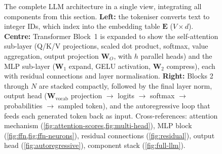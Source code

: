 \begin{landscape}
\begin{figure}[p]
\caption[The complete LLM architecture in a single view.]{%
  The complete LLM architecture in a single view, integrating all
  components from this section. \textbf{Left:} the tokeniser converts
  text to integer IDs, which index into the embedding table $\bm{E}$
  ($V \times d$). \textbf{Centre:} Transformer Block~1 is expanded to
  show the self-attention sub-layer (Q/K/V projections, scaled dot
  product, softmax, value aggregation, output projection $\bm{W}_O$,
  with $h$ parallel heads) and the MLP sub-layer ($\bm{W}_1$ expand,
  GELU activation, $\bm{W}_2$ compress), each with residual
  connections and layer normalisation. \textbf{Right:} Blocks 2
  through $N$ are stacked compactly, followed by the final layer norm,
  output head ($\bm{W}_{\text{vocab}}$ projection $\to$ logits $\to$
  softmax $\to$ probabilities $\to$ sampled token), and the
  autoregressive loop that feeds each generated token back as input.
  Cross-references: attention mechanism
  (\cref{fig:attention-scores,fig:multi-head}), MLP block
  (\cref{fig:ffn,fig:ffn-neurons}), residual connections
  (\cref{fig:residual}), output head
  (\cref{fig:autoregressive}), component stack
  (\cref{fig:full-llm}).}
\label{fig:llm-full-picture}
\end{figure}
\end{landscape}
